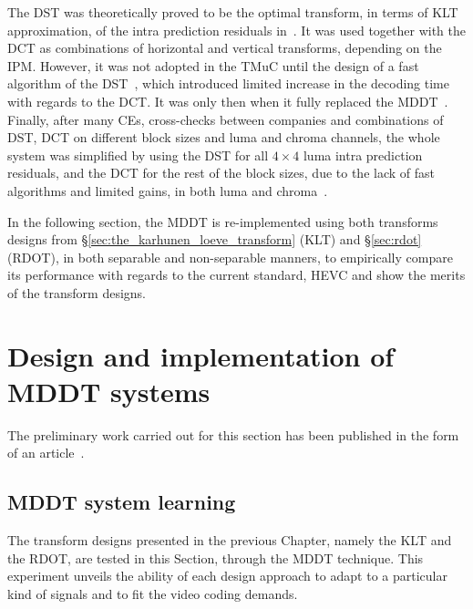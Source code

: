 \documentclass[11pt,a4paper,openright,twoside]{book}
\numberwithin{equation}{section} %
\numberwithin{figure}{section} %
\numberwithin{table}{section} %
\begin{document}
The \ac{DST} was theoretically proved to be the optimal transform, in
terms of \ac{KLT} approximation, of the intra prediction residuals
in~\cite{JCTVC-C108, JCTVC-D033}.
It was used together with the \ac{DCT} as combinations of horizontal and
vertical transforms, depending on the \ac{IPM}.
However, it was not adopted in the \ac{TMuC} until the design of a fast
algorithm of the \ac{DST}~\cite{saxena-13-fast-transforms-intra-coding}, which
introduced limited increase in the decoding time with regards to the \ac{DCT}.
It was only then when it fully replaced the \ac{MDDT}~\cite{JCTVC-D048,
JCTVC-E125, JCTVC-F283, JCTVC-G108}.
Finally, after many \acp{CE}, cross-checks between companies and combinations
of \ac{DST}, \ac{DCT} on different block sizes and luma and chroma channels,
the whole system was simplified by using the \ac{DST} for all $4\times4$ luma
intra prediction residuals, and the \ac{DCT} for the rest of the block sizes,
due to the lack of fast algorithms and limited gains, in both luma and
chroma~\cite{JCTVC-J0021}.

In the following section, the \ac{MDDT} is re-implemented using both
transforms designs from \S\ref{sec:the_karhunen_loeve_transform} (\ac{KLT})
and \S\ref{sec:rdot} (\ac{RDOT}), in both separable and non-separable manners,
to empirically compare its performance with regards to the current standard,
\ac{HEVC} and show the merits of the transform designs.

\section{Design and implementation of \acs{MDDT} systems}
\label{sec:mddt_design_and_implementation}

The preliminary work carried out for this section has been published in the
form of an article~\cite{arrufat-14-mddt-rdot}.

\subsection{\acs{MDDT} system learning}
\label{sub:mddt_system_learning}

The transform designs presented in the previous Chapter, namely the \ac{KLT}
and the \ac{RDOT}, are tested in this Section, through the \ac{MDDT}
technique.
This experiment unveils the ability of each design approach to adapt to a
particular kind of signals and to fit the video coding demands.
\end{document}
